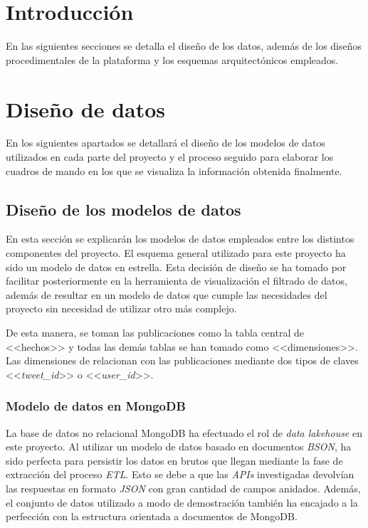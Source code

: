 
\section{Introducción}

En las siguientes secciones se detalla el diseño de los datos, además de los diseños procedimentales de la plataforma y los esquemas arquitectónicos empleados.

\section{Diseño de datos}

En los siguientes apartados se detallará el diseño de los modelos de datos utilizados en cada parte del proyecto y el proceso seguido para elaborar los cuadros de mando en los que se visualiza la información obtenida finalmente.

\subsection{Diseño de los modelos de datos}

En esta sección se explicarán los modelos de datos empleados entre los distintos componentes del proyecto. El esquema general utilizado para este proyecto ha sido un modelo de datos en estrella. Esta decisión de diseño se ha tomado por facilitar posteriormente en la herramienta de visualización el filtrado de datos, además de resultar en un modelo de datos que cumple las necesidades del proyecto sin necesidad de utilizar otro más complejo.

De esta manera, se toman las publicaciones como la tabla central de <<hechos>> y todas las demás tablas se han tomado como <<dimensiones>>. Las dimensiones de relacionan con las publicaciones mediante dos tipos de claves <<\textit{tweet\_id}>> o <<\textit{user\_id}>>.

\subsubsection{Modelo de datos en MongoDB}

La base de datos no relacional MongoDB ha efectuado el rol de \textit{data lakehouse} en este proyecto. Al utilizar un modelo de datos basado en documentos \textit{BSON}, ha sido perfecta para persistir los datos en brutos que llegan mediante la fase de extracción del proceso \textit{ETL}. Esto se debe a que las \textit{APIs} investigadas devolvían las respuestas en formato \textit{JSON} con gran cantidad de campos anidados. Además, el conjunto de datos utilizado a modo de demostración también ha encajado a la perfección con la estructura orientada a documentos de MongoDB.

